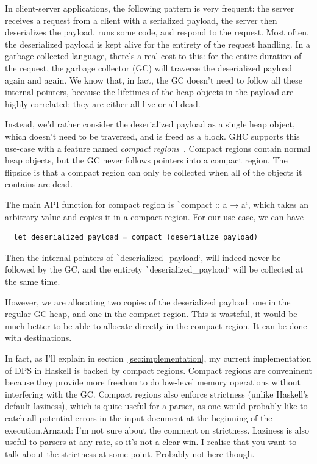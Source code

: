 \documentclass[english]{jflart}
\newcommand{\TODO}[1]{{\color{red}\large #1}}
\begin{document}
In client-server applications, the following pattern is very frequent: the server receives a request from a client with a serialized payload, the server then deserializes the payload, runs some code, and respond to the request. Most often, the deserialized payload is kept alive for the entirety of the request handling. In a garbage collected language, there's a real cost to this: for the entire duration of the request, the garbage collector (GC) will traverse the deserialized payload again and again. We know that, in fact, the GC doesn't need to follow all these internal pointers, because the lifetimes of the heap objects in the payload are highly correlated: they are either all live or all dead.

Instead, we'd rather consider the deserialized payload as a single heap object, which doesn't need to be traversed, and is freed as a block. GHC supports this use-case with a feature named \emph{compact regions}~\cite{yang_efficient_2015}. Compact regions contain normal heap objects, but the GC never follows pointers into a compact region. The flipside is that a compact region can only be collected when all of the objects it contains are dead.

The main API function for compact region is \texttt`compact :: a → a`, which takes an arbitrary value and copies it in a compact region. For our use-case, we can have

{\small
\begin{verbatim}
  let deserialized_payload = compact (deserialize payload)
\end{verbatim}
}

Then the internal pointers of \texttt`deserialized_payload`, will indeed never be followed by the GC, and the entirety \texttt`deserialized_payload` will be collected at the same time.

However, we are allocating two copies of the deserialized payload: one in the regular GC heap, and one in the compact region. This is wasteful, it would be much better to be able to allocate directly in the compact region. It can be done with destinations.

In fact, as I'll explain in section~\ref{sec:implementation}, my current implementation of DPS in Haskell is backed by compact regions. Compact regions are conveninent because they provide more freedom to do low-level memory operations without interfering with the GC. Compact regions also enforce strictness (unlike Haskell's default laziness), which is quite useful for a parser, as one would probably like to catch all potential errors in the input document at the beginning of the execution.\TODO{Arnaud: I'm not sure about the comment on strictness. Laziness is also useful to parsers at any rate, so it's not a clear win. I realise that you want to talk about the strictness at some point. Probably not here though.}
\end{document}
